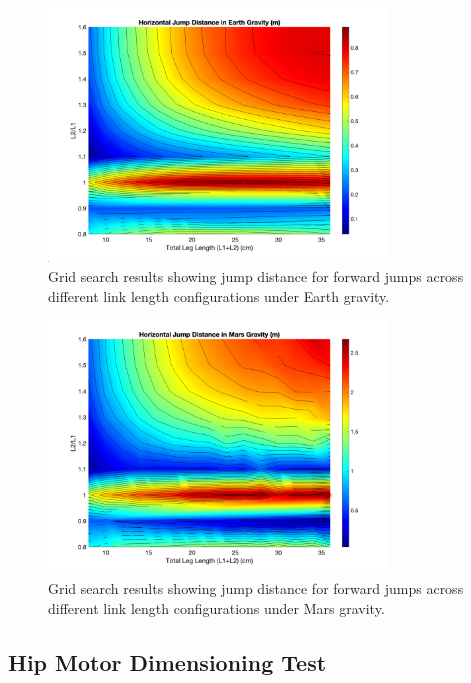 \begin{figure}[H]
    \centering
    \includegraphics[width=0.8\textwidth]{Images/results/grid_search_forward_earth.png}
    \caption{Grid search results showing jump distance for forward jumps across different link length configurations under Earth gravity.}
    \label{fig:results:grid_search_forward_earth}
\end{figure}

\begin{figure}[H]
    \centering
    \includegraphics[width=0.8\textwidth]{Images/results/grid_search_forward_mars.png}
    \caption{Grid search results showing jump distance for forward jumps across different link length configurations under Mars gravity.}
    \label{fig:results:grid_search_forward_mars}
\end{figure}


\subsection{Hip Motor Dimensioning Test}
\label{sec:hip_motor_dimensioning_test}

